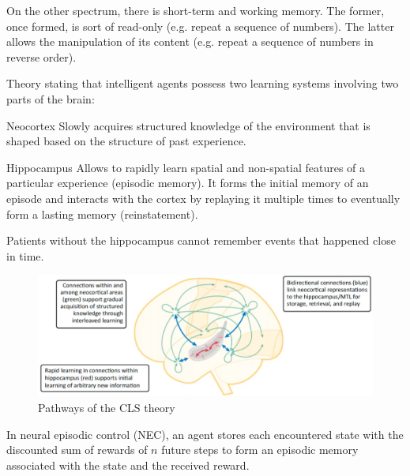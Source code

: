 \begin{description}
        \begin{remark}
            On the other spectrum, there is short-term and working memory.
            The former, once formed, is sort of read-only (e.g. repeat a sequence of numbers). The latter allows the manipulation of its content (e.g. repeat a sequence of numbers in reverse order).
        \end{remark}

    \item[Complementary learning systems (CLS) theory] 
        Theory stating that intelligent agents possess two learning systems involving two parts of the brain:
        \begin{descriptionlist}
            \item[Neocortex] 
                Slowly acquires structured knowledge of the environment that is shaped based on the structure of past experience.
            \item[Hippocampus] 
                Allows to rapidly learn spatial and non-spatial features of a particular experience (episodic memory).
                It forms the initial memory of an episode and interacts with the cortex by replaying it multiple times to eventually form a lasting memory (reinstatement).
                \begin{remark}
                    Patients without the hippocampus cannot remember events that happened close in time.
                \end{remark}
        \end{descriptionlist}
        \begin{figure}[H]
            \centering
            \includegraphics[width=0.7\linewidth]{./img/cls_theory.png}
            \caption{Pathways of the CLS theory}
        \end{figure}

        \begin{casestudy}
            In neural episodic control (NEC), an agent stores each encountered state with the discounted sum of rewards of $n$ future steps to form an episodic memory associated with the state and the received reward.


\end{casestudy}
\end{description}
